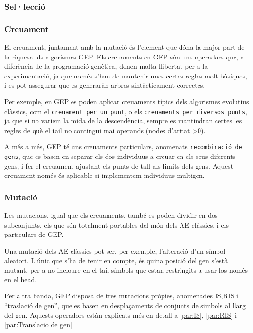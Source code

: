 \subsubsection{Sel·lecció} %
\label{ssub:Seleccio}


\subsubsection{Creuament} %
\label{ssub:Creuament}

El creuament, juntament amb la mutació és l'element que dóna la major part de la
riquesa als algorismes GEP.  Els creuaments en GEP són uns operadors que, a
diferència de la programació genètica, donen molta llibertat per a la
experimentació, ja que només s'han de mantenir unes certes regles molt bàsiques,
i es pot assegurar que es generaràn arbres sintàcticament correctes.

Per exemple, en GEP es poden aplicar creuaments típics dels algorismes evolutius
clàssics, com el \texttt{creuament per un punt}, o els \texttt{creuaments per
diversos punts}, ja que si no variem la mida de la descendència, sempre es
mantindran certes les regles de què el tail no contingui mai operands (nodes
d'aritat >0).

A més a més, GEP té uns creuaments particulars, anomenats \texttt{recombinació
de gens}, que es basen en separar els dos individuus a creuar en els seus
diferents gens, i fer el creuament ajustant els punts de tall als limits dels
gens.  Aquest creuament només és aplicable si implementem individuus multigen.

\subsubsection{Mutació} %
\label{ssub:Mutacio}
Les mutacions, igual que els creuaments, també es poden dividir en dos
subconjunts, els que són totalment portables del món dels AE clàssics, i els
particulars de GEP.

Una mutació dels AE clàssics pot ser, per exemple, l'alteració d'un símbol
aleatori.  L'únic que s'ha de tenir en compte, és quina posició del gen s'està
mutant, per a no incloure en el tail símbols que estan restringits a usar-los
només en el head.

Per altra banda, GEP disposa de tres mutacions pròpies, anomenades IS,RIS i
``traslació de gen'', que es basen en desplaçaments de conjunts de simbols al
llarg del gen.  Aquests operadors estàn explicats més en detall a \ref{par:IS},
\ref{par:RIS} i \ref{par:Translacio de gen}

